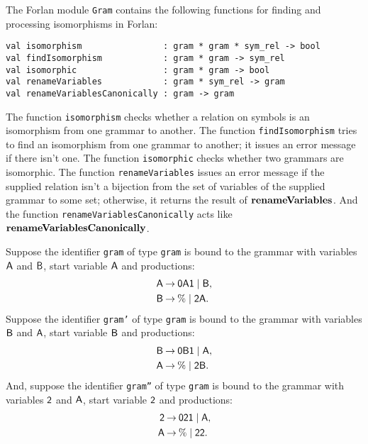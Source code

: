 The Forlan module \texttt{Gram} contains the following functions
for finding and processing isomorphisms in Forlan:
\begin{verbatim}
val isomorphism                : gram * gram * sym_rel -> bool
val findIsomorphism            : gram * gram -> sym_rel
val isomorphic                 : gram * gram -> bool
val renameVariables            : gram * sym_rel -> gram
val renameVariablesCanonically : gram -> gram
\end{verbatim}
%
%
%
%
%
The function \texttt{isomorphism} checks whether a relation on symbols
is an isomorphism from one grammar to another.  The function
\texttt{findIsomorphism} tries to find an isomorphism from one grammar
to another; it issues an error message if there isn't one.  The
function \texttt{isomorphic} checks whether two grammars are
isomorphic.  The function \texttt{renameVariables} issues an error
message if the supplied relation isn't a bijection from the set of
variables of the supplied grammar to some set; otherwise, it returns
the result of $\mathbf{renameVariables}$.  And the function
\texttt{renameVariablesCanonically} acts like
$\mathbf{renameVariablesCanonically}$.

Suppose the identifier \texttt{gram} of type \texttt{gram} is bound to the
grammar with variables $\mathsf{A}$ and $\mathsf{B}$, start variable $\mathsf{A}$ and
productions:
\begin{align*}
\mathsf{A} &\mathbin{\to} \mathsf{0}\mathsf{A}\mathsf{1} \mid \mathsf{B} , \\
\mathsf{B} &\mathbin{\to} \% \mid \mathsf{2}\mathsf{A} .
\end{align*}
Suppose the identifier \texttt{gram'} of type \texttt{gram} is bound to
the grammar with variables $\mathsf{B}$ and $\mathsf{A}$, start variable $\mathsf{B}$
and productions:
\begin{align*}
\mathsf{B} &\mathbin{\to} \mathsf{0}\mathsf{B}\mathsf{1} \mid \mathsf{A} , \\ \mathsf{A} &\mathbin{\to} \% \mid
\mathsf{2}\mathsf{B} .
\end{align*}
And, suppose the identifier \texttt{gram''} of type \texttt{gram} is bound
to the grammar with variables $\mathsf{2}$ and $\mathsf{A}$, start variable
$\mathsf{2}$ and productions:
\begin{align*}
\mathsf{2} &\mathbin{\to} \mathsf{0}\mathsf{2}\mathsf{1} \mid \mathsf{A} , \\
\mathsf{A} &\mathbin{\to} \% \mid \mathsf{2}\mathsf{2} .
\end{align*}


